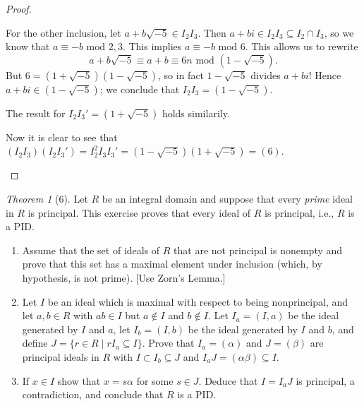 \documentclass[12pt]{article}
\theoremstyle{remark}
\theoremstyle{named}
\newtheorem*{theorem}{Theorem}
\renewcommand{\a}{\alpha}
\renewcommand{\b}{\beta}
\renewcommand{\mod}{\text{ mod }}
\begin{document}
\begin{proof}
\begin{enumerate}
        For the other inclusion, let \(a + b\sqrt{-5} \in I_2 I_3\). Then \(a + bi \in I_2 I_3 \subseteq I_2 \cap I_3\), so we know that \(a \equiv -b \mod 2, 3\). This implies \(a \equiv -b \mod 6\). This allows us to rewrite \[a + b\sqrt{-5} \equiv a + b \equiv 6n \mod (1 - \sqrt{-5}).\]
        But \(6 = (1 + \sqrt{-5})(1 - \sqrt{-5})\), so in fact \(1 - \sqrt{-5}\) divides \(a + bi\)! Hence \(a + bi \in (1 - \sqrt{-5})\); we conclude that \(I_2 I_3 = (1 - \sqrt{-5})\). 

        The result for \(I_2 I_3' = (1 + \sqrt{-5})\) holds similarily.

        Now it is clear to see that \((I_2 I_3) (I_2 I_3') = I_2^2 I_3 I_3' = (1 - \sqrt{-5})(1 + \sqrt{-5}) = (6)\).
    \end{enumerate}
\end{proof}

\begin{theorem}[6]
    Let \(R\) be an integral domain and suppose that every \textit{prime} ideal in \(R\) is principal. This exercise proves that every ideal of \(R\) is principal, i.e., \(R\) is a PID.
    \begin{enumerate}
        \item Assume that the set of ideals of \(R\) that are not principal is nonempty and prove that this set has a maximal element under inclusion (which, by hypothesis, is not prime). [Use Zorn's Lemma.]
        \item Let \(I\) be an ideal which is maximal with respect to being nonprincipal, and let \(a, b\in R\) with \(ab \in I\) but \(a \notin I\) and \(b \notin I\). Let \(I_a = (I, a)\) be the ideal generated by \(I\) and \(a\), let \(I_b = (I, b)\) be the ideal generated by \(I\) and \(b\), and define \(J = \{r \in R \mid rI_a \subseteq I\}\). Prove that \(I_a = (\a)\) and \(J = (\b)\) are principal ideals in \(R\) with \(I \subset I_b \subseteq J\) and \(I_a J = (\a \b) \subseteq I\).
        \item If \(x \in I\) show that \(x = s \a\) for some \(s \in J\). Deduce that \(I = I_a J\) is principal, a contradiction, and conclude that \(R\) is a PID.
    \end{enumerate}
\end{theorem}
\end{document}
